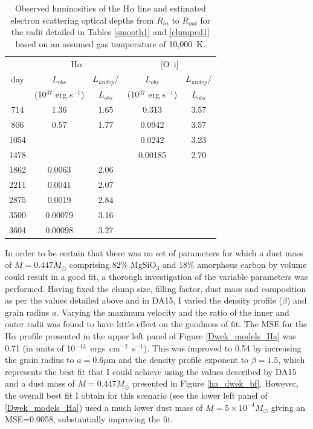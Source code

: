 \setlength{\tabcolsep}{12pt}
\begin{table}
\caption{Observed luminosities of the H$\alpha$ line and estimated 
electron scattering optical depths from $R_{in}$ to $R_{out}$ for the 
radii detailed in Tables \ref{smooth1} and \ref{clumped1} based on an 
assumed gas temperature of 10,000~K.}
\centering
\begin{tabular}{@{}ccccc@{}}
\hline
& \multicolumn{2}{c}{H$\alpha$} &  \multicolumn{2}{c}{[O~{\sc i}]}  \\
day &  $L_{obs}$ & $L_{undep}$/  &  $L_{obs}$ & $L_{undep}$/    \\
& (10$^{37}$ erg s$^{-1}$) &$L_{obs}$& (10$^{37}$ erg s$^{-1}$) & $L_{obs}$ \\
\hline
714 & 1.36 & 1.65 &0.313&3.57  \\
806 & 0.57 & 1.77 &0.0942&3.57\\
1054 &&&0.0242&3.23 \\
1478 &&& 0.00185&2.70 \\
1862 & 0.0063 & 2.06 &&  \\
2211 & 0.0041 & 2.07 &&  \\
2875 & 0.0019 & 2.84 & &  \\
3500 & 0.00079 & 3.16 & & \\
3604 & 0.00098 & 3.27 && \\

\hline
\end{tabular}

\label{tau_e2}
\end{table}%
\setlength{\tabcolsep}{8pt}

In order to be certain that there was no set of parameters for which a dust mass of $M=0.447M_{\odot}$ comprising 82\% MgSiO$_3$ and 18\% amorphous carbon by volume could result in a good fit, a thorough investigation of the variable parameters was performed.  Having fixed the clump size, filling factor, dust mass and composition as per the values detailed above and in DA15, I varied the density profile ($\beta$) and grain radius $a$.  Varying the maximum velocity and the ratio of the inner and outer radii was found to have little effect on the goodness of fit.  The MSE for the H$\alpha$ profile presented in the upper left panel of Figure \ref{Dwek_models_Ha} was 0.71 (in units of 10$^{-13}$~ergs~cm$^{-2}$~s$^{-1}$).  This was improved to 0.54 by increasing the grain radius to $a=0.6\mu$m and the density profile exponent to $\beta=1.5$, which represents the best fit that I could achieve using the values described by DA15 and a dust mass of $M=0.447M_{\odot}$ presented in Figure \ref{ha_dwek_bf}.  However, the overall best fit I obtain for this scenario (see the lower left panel of \ref{Dwek_models_Ha}) used a much lower dust mass of $M=5 \times 10^{-4}M_{\odot}$ giving an MSE=0.0058, substantially improving the fit.

